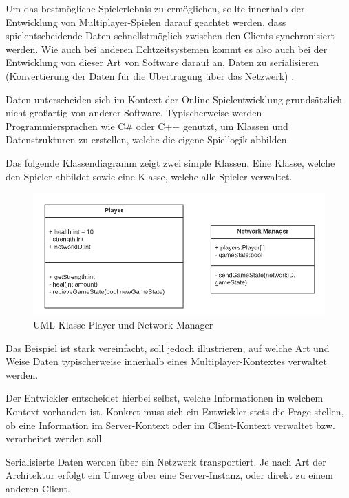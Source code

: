 Um das bestmögliche Spielerlebnis zu ermöglichen, sollte innerhalb der Entwicklung von Multiplayer-Spielen darauf geachtet werden, dass spielentscheidende Daten schnellstmöglich zwischen den Clients synchronisiert werden. Wie auch bei anderen Echtzeitsystemen \cite{Wikipedia.2021} kommt es also auch bei der Entwicklung von dieser Art von Software darauf an, Daten zu serialisieren (Konvertierung der Daten für die Übertragung über das Netzwerk) \cite{Wikipedia.2019}. 

Daten unterscheiden sich im Kontext der Online Spielentwicklung grundsätzlich nicht großartig von anderer Software. Typischerweise werden Programmiersprachen wie C\# oder C++ genutzt, um Klassen und Datenstrukturen zu erstellen, welche die eigene Spiellogik abbilden. \cite{Glinka.2008}

Das folgende Klassendiagramm zeigt zwei simple Klassen. Eine Klasse, welche den Spieler abbildet sowie eine Klasse, welche alle Spieler verwaltet.

\begin{figure}[H]
	\centering
	\includegraphics[width=150mm]{images/UML_class_Player_NM.png}
	\caption[UML Klassen]{UML Klasse Player und Network Manager}
	\label{pic:UML_class_Player_NM}
\end{figure}

Das Beispiel ist stark vereinfacht, soll jedoch illustrieren, auf welche Art und Weise Daten typischerweise innerhalb eines Multiplayer-Kontextes verwaltet werden.

Der Entwickler entscheidet hierbei selbst, welche Informationen in welchem Kontext vorhanden ist. Konkret muss sich ein Entwickler stets die Frage stellen, ob eine Information im Server-Kontext oder im Client-Kontext verwaltet bzw. verarbeitet werden soll.

Serialisierte Daten werden über ein Netzwerk transportiert. Je nach Art der Architektur erfolgt ein Umweg über eine Server-Instanz, oder direkt zu einem anderen Client. \cite{Smed.2002c}

